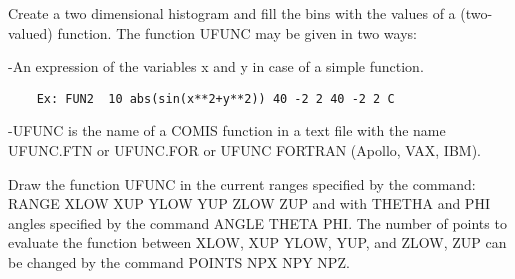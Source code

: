 \ENDCMD


\BEGARG
{}
\ENDARG
{}
\ENDOPT

   \par
Create a two dimensional histogram and fill the bins with the values of a 
   (two-valued) function.  The function UFUNC may be given in two ways:  

   \par
-An expression of the variables x and y in case of a simple function.  
\begin{verbatim}
    Ex: FUN2  10 abs(sin(x**2+y**2)) 40 -2 2 40 -2 2 C
\end{verbatim}
   \par
-UFUNC is the name of a COMIS function in a text file with the name 
   UFUNC.FTN or UFUNC.FOR or UFUNC FORTRAN (Apollo, VAX, IBM).  

\ENDCMD


\BEGARG
{}
\ENDARG

   \par
Draw the function UFUNC in the current ranges specified by the command:  
   RANGE XLOW XUP YLOW YUP ZLOW ZUP and with THETHA and PHI angles specified 
   by the command ANGLE THETA PHI. The number of points to evaluate the 
   function between XLOW, XUP YLOW, YUP, and ZLOW, ZUP can be changed by the 
   command POINTS NPX NPY NPZ.  

